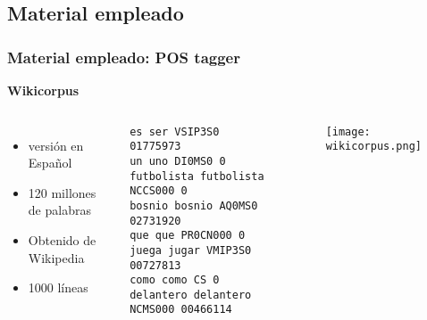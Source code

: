\documentclass{beamer}
\begin{document}
\subsection{Material empleado}
\begin{frame}[fragile]
\frametitle{Material empleado: POS tagger}
\textbf{Wikicorpus}
\begin{columns}[c] %
\begin{itemize}\fontsize{7}{8}\selectfont
\item versión en Español
\item 120 millones de palabras
\item Obtenido de Wikipedia
\item 1000 líneas
\end{itemize}
\begin{example}[Wikicorpus]
\begin{tiny}\fontsize{5}{8}\selectfont
\begin{verbatim}
es ser VSIP3S0 01775973
un uno DI0MS0 0
futbolista futbolista NCCS000 0
bosnio bosnio AQ0MS0 02731920
que que PR0CN000 0
juega jugar VMIP3S0 00727813
como como CS 0
delantero delantero NCMS000 00466114
\end{verbatim}\end{tiny}
\end{example}
\begin{normalsize}
\begin{figure}
\texttt{[image: wikicorpus.png]}
\end{figure}
\end{normalsize}
\end{columns}
\end{frame}
\end{document}
